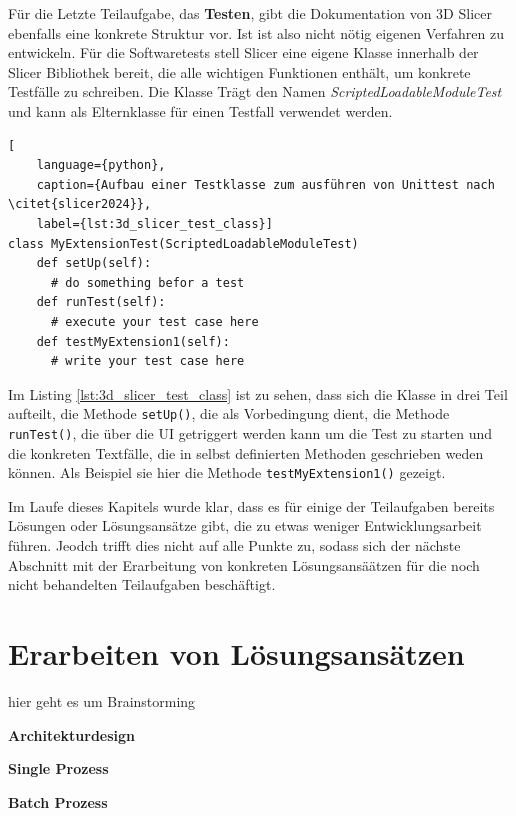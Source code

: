 Für die Letzte Teilaufgabe, das \textbf{Testen}, gibt die Dokumentation von 3D Slicer
ebenfalls eine konkrete Struktur vor. Ist ist also nicht nötig eigenen Verfahren
zu entwickeln. Für die Softwaretests stell Slicer eine eigene Klasse innerhalb der
Slicer Bibliothek bereit, die alle wichtigen Funktionen enthält, um konkrete Testfälle
zu schreiben. Die Klasse Trägt den Namen \textsl{ScriptedLoadableModuleTest} und
kann als Elternklasse für einen Testfall verwendet werden.

\begin{lstlisting}[
    language={python},
    caption={Aufbau einer Testklasse zum ausführen von Unittest nach \citet{slicer2024}},
    label={lst:3d_slicer_test_class}]
class MyExtensionTest(ScriptedLoadableModuleTest)
    def setUp(self):
      # do something befor a test
    def runTest(self):
      # execute your test case here
    def testMyExtension1(self):
      # write your test case here
\end{lstlisting}

Im Listing \ref{lst:3d_slicer_test_class} ist zu sehen, dass sich die Klasse in drei
Teil aufteilt, die Methode \texttt{setUp()}, die als Vorbedingung dient, die Methode
\texttt{runTest()}, die über die UI getriggert werden kann um die Test zu starten
und die konkreten Textfälle, die in selbst definierten Methoden geschrieben
weden können. Als Beispiel sie hier die Methode \texttt{testMyExtension1()}
gezeigt.

Im Laufe dieses Kapitels wurde klar, dass es für einige der Teilaufgaben bereits
Lösungen oder Lösungsansätze gibt, die zu etwas weniger Entwicklungsarbeit
führen. Jeodch trifft dies nicht auf alle Punkte zu, sodass sich der nächste
Abschnitt mit der Erarbeitung von konkreten Lösungsansäätzen für die noch nicht
behandelten Teilaufgaben beschäftigt.

\section{Erarbeiten von Lösungsansätzen}
\label{sec:lösungsansätze} hier geht es um Brainstorming

\textbf{Architekturdesign}

\textbf{Single Prozess}

\textbf{Batch Prozess}


